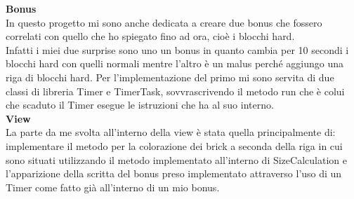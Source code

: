 \documentclass[a4paper,12pt]{report}
\begin{document}
\textbf{Bonus}\\
In questo progetto mi sono anche dedicata a creare due bonus che fossero correlati con quello che ho spiegato fino ad ora, cioè i blocchi hard.
\\Infatti i miei due surprise sono uno un bonus in quanto cambia per 10 secondi i blocchi hard con quelli normali mentre l'altro è un malus perché aggiungo una riga di
blocchi hard. Per l'implementazione del primo mi sono servita di due classi di libreria Timer e TimerTask, sovvrascrivendo il metodo run che è colui che scaduto il Timer
esegue le istruzioni che ha al suo interno.\\
\textbf{View}\\
La parte da me svolta all'interno della view è stata quella principalmente di: implementare il metodo per la colorazione dei brick a seconda della riga in cui sono situati utilizzando
il metodo implementato all'interno di SizeCalculation e l'apparizione della scritta del bonus preso implementato attraverso l'uso di un Timer come fatto già all'interno di un mio bonus.
\pagebreak
\end{document}
